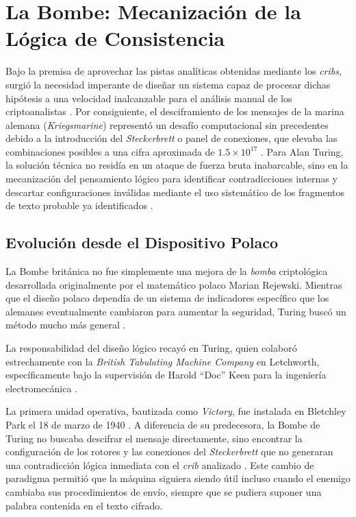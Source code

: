 \section{La Bombe: Mecanización de la Lógica de Consistencia}

Bajo la premisa de aprovechar las pistas analíticas obtenidas mediante los \textit{cribs}, surgió la necesidad imperante de diseñar un sistema capaz de procesar dichas hipótesis a una velocidad inalcanzable para el análisis manual de los criptoanalistas \cite{copeland2004essential, copeland2006colossus}. Por consiguiente, el desciframiento de los mensajes de la marina alemana (\textit{Kriegsmarine}) representó un desafío computacional sin precedentes debido a la introducción del \textit{Steckerbrett} o panel de conexiones, que elevaba las combinaciones posibles a una cifra aproximada de $1.5 \times 10^{17}$ \cite{lahoz2012turing}. Para Alan Turing, la solución técnica no residía en un ataque de fuerza bruta inabarcable, sino en la mecanización del pensamiento lógico para identificar contradicciones internas y descartar configuraciones inválidas mediante el uso sistemático de los fragmentos de texto probable ya identificados \cite{hodges2014turing, copeland2006colossus}.

\subsection{Evolución desde el Dispositivo Polaco}

La Bombe británica no fue simplemente una mejora de la \textit{bomba} criptológica desarrollada originalmente por el matemático polaco Marian Rejewski. Mientras que el diseño polaco dependía de un sistema de indicadores específico que los alemanes eventualmente cambiaron para aumentar la seguridad, Turing buscó un método mucho más general \cite{copeland2006colossus, lahoz2012turing}. 

La responsabilidad del diseño lógico recayó en Turing, quien colaboró estrechamente con la \textit{British Tabulating Machine Company} en Letchworth, específicamente bajo la supervisión de Harold ``Doc'' Keen para la ingeniería electromecánica \cite{strathern1997turing, copeland2006colossus}. 

La primera unidad operativa, bautizada como \textit{Victory}, fue instalada en Bletchley Park el 18 de marzo de 1940 \cite{hodges2014turing}. A diferencia de su predecesora, la Bombe de Turing no buscaba descifrar el mensaje directamente, sino encontrar la configuración de los rotores y las conexiones del \textit{Steckerbrett} que no generaran una contradicción lógica inmediata con el \textit{crib} analizado \cite{copeland2004essential}. Este cambio de paradigma permitió que la máquina siguiera siendo útil incluso cuando el enemigo cambiaba sus procedimientos de envío, siempre que se pudiera suponer una palabra contenida en el texto cifrado. 

